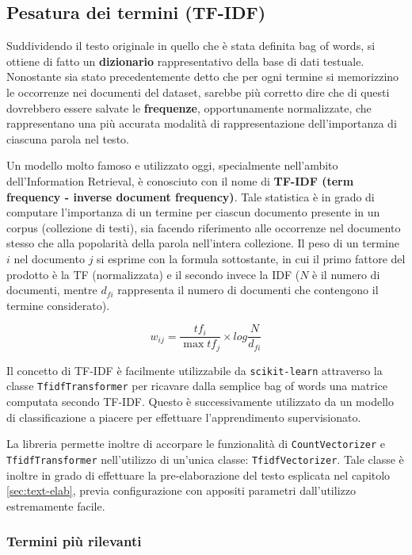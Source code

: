 \documentclass[hidelinks, 12pt]{article}
\begin{document}
\subsection{Pesatura dei termini (TF-IDF)}

Suddividendo il testo originale in quello che è stata definita bag of words, si ottiene di fatto un \textbf{dizionario} rappresentativo della base di dati testuale. Nonostante sia stato precedentemente detto che per ogni termine si memorizzino le occorrenze nei documenti del dataset, sarebbe più corretto dire che di questi dovrebbero essere salvate le \textbf{frequenze}, opportunamente normalizzate, che rappresentano una più accurata modalità di rappresentazione dell'importanza di ciascuna parola nel testo.

Un modello molto famoso e utilizzato oggi, specialmente nell'ambito dell'Information Retrieval, è conosciuto con il nome di \textbf{TF-IDF (term frequency - inverse document frequency)}. Tale statistica è in grado di computare l'importanza di un termine per ciascun documento presente in un corpus (collezione di testi), sia facendo riferimento alle occorrenze nel documento stesso che alla popolarità della parola nell'intera collezione. Il peso di un termine $i$ nel documento $j$ si esprime con la formula sottostante, in cui il primo fattore del prodotto è la TF (normalizzata) e il secondo invece la IDF ($N$ è il numero di documenti, mentre \(d_{fi}\) rappresenta il numero di documenti che contengono il termine considerato).

\[ w_{ij} = \frac{tf_{i}}{\max tf_{j}} \times log\frac{N}{d_{fi}} \]

Il concetto di TF-IDF è facilmente utilizzabile da \texttt{scikit-learn} attraverso la classe \texttt{TfidfTransformer} per ricavare dalla semplice bag of words una matrice computata secondo TF-IDF. Questo è successivamente utilizzato da un modello di classificazione a piacere per effettuare l'apprendimento supervisionato.

La libreria permette inoltre di accorpare le funzionalità di \texttt{CountVectorizer} e \texttt{TfidfTransformer} nell'utilizzo di un'unica classe: \texttt{TfidfVectorizer}. Tale classe è inoltre in grado di effettuare la pre-elaborazione del testo esplicata nel capitolo \ref{sec:text-elab}, previa configurazione con appositi parametri dall'utilizzo estremamente facile. 

\vspace{6ex}

\subsubsection{Termini più rilevanti}
\end{document}

